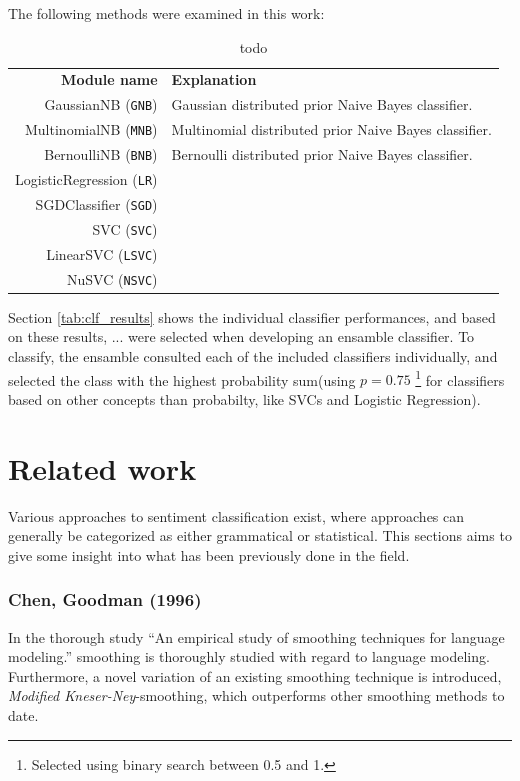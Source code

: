 \documentclass[a4paper,11pt]{kth-mag}
\newcommand{\todo}{ ... }
\begin{document}
The following methods were examined in this work:

\begin{table}[h]
  \centering
  \begin{tabular}{ r l }
    \textbf{Module name} & \textbf{Explanation}\\
    GaussianNB (\texttt{GNB}) & Gaussian distributed prior Naive Bayes classifier.\\
    MultinomialNB (\texttt{MNB}) & Multinomial distributed prior Naive Bayes classifier. \\
    BernoulliNB (\texttt{BNB})& Bernoulli distributed prior Naive Bayes classifier.\\
    LogisticRegression (\texttt{LR}) & \\
    SGDClassifier (\texttt{SGD}) & \\
    SVC (\texttt{SVC})& \\
    LinearSVC (\texttt{LSVC}) & \\
    NuSVC (\texttt{NSVC})& \\
  \end{tabular}
  \caption{todo}
  \label{tab:scikit_classifiers}
\end{table}

Section \ref{tab:clf_results} shows the individual classifier performances, and based on these results,
\todo were selected when developing an ensamble classifier. To classify, the ensamble consulted each of
the included classifiers individually, and selected the class with the highest probability sum(using
$p=0.75$ \footnote{Selected using binary search between 0.5 and 1.}
for classifiers based on other concepts than probabilty, like SVCs and Logistic Regression).



\newpage
\section{Related work}
Various approaches to sentiment classification exist, where approaches can generally be categorized as either grammatical\cite{todo} or statistical\cite{todo}. This sections aims to give some insight into what has been previously done in the field.

\subsubsection{Chen, Goodman (1996)}
In the thorough study ``An empirical study of smoothing techniques for language modeling.'' smoothing is
thoroughly studied with regard to language modeling. Furthermore, a novel variation of an existing
smoothing technique is introduced, \emph{Modified Kneser-Ney}-smoothing, which outperforms other
smoothing methods to date.
\end{document}
